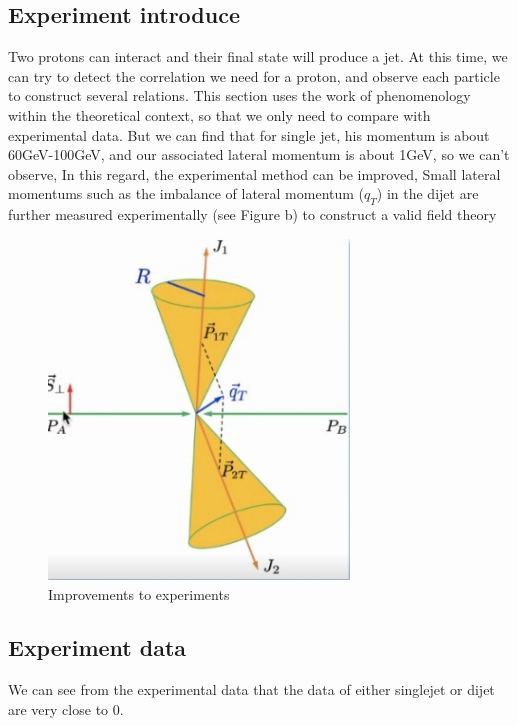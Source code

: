 \documentclass[12pt, a4paper, oneside]{article}
\begin{document}
\begin{spacing}{2.0}
\subsection{Experiment introduce}
Two protons can interact and their final state will produce a jet. At this time, we can try to detect the correlation we need for a proton, and observe each particle to construct several relations.
This section uses the work of phenomenology within the theoretical context, so that we only need to compare with experimental data.
But we can find that for single jet, his momentum is about 60GeV-100GeV, and our associated lateral momentum is about 1GeV, so we can't observe,
In this regard, the experimental method can be improved,
Small lateral momentums such as the imbalance of lateral momentum ($q_T$) in the dijet are further measured experimentally (see Figure b) to construct a valid field theory
\begin{figure}
    \centering
    \includegraphics[width=8cm]{delta.jpg}
    \caption{Improvements to experiments}
\end{figure}

\subsection{Experiment data}
We can see from the experimental data that the data of either singlejet or dijet are very close to 0.


\end{spacing}
\end{document}
